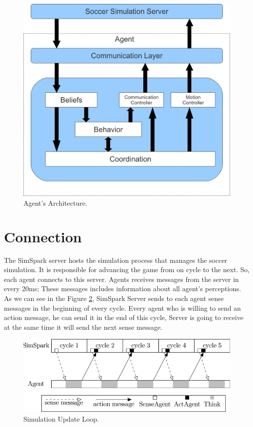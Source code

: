 \begin{figure}[htb!]
\centering
  \includegraphics[scale=0.6]{Chapter3/figures/Arch.pdf}
  \caption{Agent's Architecture.}
  \label{fig:Architecture}
\end{figure}


\section{Connection}
The SimSpark server hosts the simulation process that manages the soccer simulation. It is responsible for advancing the game from on cycle to the next. So, each agent
connects to this server. Agents receives messages from the server in every 20ms; These messages includes information about all agent's perceptions. As we can see in the Figure \ref{fig:Simulation-Update-Loop}, SimSpark Server sends to each agent sense messages in the beginning of every cycle. Every agent who is willing to send an action message, he can send it in the end of this cycle, Server is going to receive at the same time it will send the next sense message.
\begin{figure}[htb!]
\centering
  \includegraphics[scale=0.4]{Chapter2/figures/800px-SimulationUpdateLoopSynchronizationBetweenSimSparkAndAgent.png}
  \caption{Simulation Update Loop.}
  \label{fig:Simulation-Update-Loop}
\end{figure}



